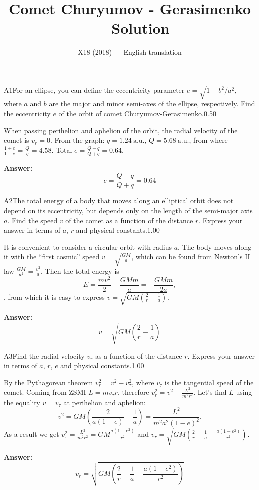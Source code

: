 \documentclass[11pt,a4paper]{article}
\title{\textbf{Comet Churyumov - Gerasimenko --- Solution}}
\author{\normalsize X18 (2018) — English translation}
\date{}
\begin{document}
\maketitle\vspace{-0.5em}
\begin{solcard}{A1}{For an ellipse, you can define the eccentricity parameter $e=\sqrt{1-b^2/a^2}$, where $a$ and $b$ are the major and minor semi-axes of the ellipse, respectively. Find the eccentricity $e$ of the orbit of comet Churyumov-Gerasimenko.}{0.50}

When passing perihelion and aphelion of the orbit, the radial velocity of the comet is $v_r=0$. From the graph: $q=1.24~\text{a.u.}$, $Q=5.68~\text{a.u.}$, from where $\frac{1+e}{1-e}=\frac{Q}{q}=4.58$. Total $e=\frac{Q-q}{Q+q}=0.64$.

\par\smallskip\noindent\textbf{Answer:} $$e=\frac{Q-q}{Q+q}=0.64$$
\end{solcard}

\begin{solcard}{A2}{The total energy of a body that moves along an elliptical orbit does not depend on its eccentricity, but depends only on the length of the semi-major axis $a$. Find the speed $v$ of the comet as a function of the distance $r$. Express your answer in terms of $a$, $r$ and physical constants.}{1.00}

It is convenient to consider a circular orbit with radius $a$. The body moves along it with the “first cosmic” speed $v=\sqrt{\frac{GM}{a}}$, which can be found from Newton’s II law $\frac{GM}{a^2} = \frac{v^2}{a}$. Then the total energy is \[E=  \frac{mv^2}{2}-\frac{GMm}{a}=-\frac{GMm}{2a},\], from which it is easy to express $v= \sqrt{GM \left( \frac{2}{r}-\frac{1}{a} \right) }$.

\par\smallskip\noindent\textbf{Answer:} $$ v=\sqrt{G M\left(\frac{2}{r}-\frac{1}{a}\right)} $$
\end{solcard}

\begin{solcard}{A3}{Find the radial velocity $v_r$ as a function of the distance $r$. Express your answer in terms of $a$, $r$, $e$ and physical constants.}{1.00}

By the Pythagorean theorem $v_r^2=v^2-v_\tau^2$, where $v_\tau$ is the tangential speed of the comet. Coming from ZSMI $L=mv_\tau r$, therefore $v_r^2=v^2 - \frac{L^2}{m^2r^2}$. Let's find $L$ using the equality $v=v_\tau$ at perihelion and aphelion: \[ v^2=GM \left( \frac{2}{a(1-e)} -\frac{1}{a}\right)=\frac{L^2}{m^2 a^2(1-e)^2}.\] As a result we get $v_\tau^2 = \frac{L^2}{m^2 r^2} = GM \frac{a(1-e^2)}{r^2}$ and $v_{r}=\sqrt{G M\left(\frac{2}{r}-\frac{1}{a}-\frac{a\left(1-e^{2}\right)}{r^{2}}\right)}$.

\par\smallskip\noindent\textbf{Answer:} $$ v_{r}=\sqrt{G M\left(\frac{2}{r}-\frac{1}{a}-\frac{a\left(1-e^{2}\right)}{r^{2}}\right)} $$
\end{solcard}
\end{document}
